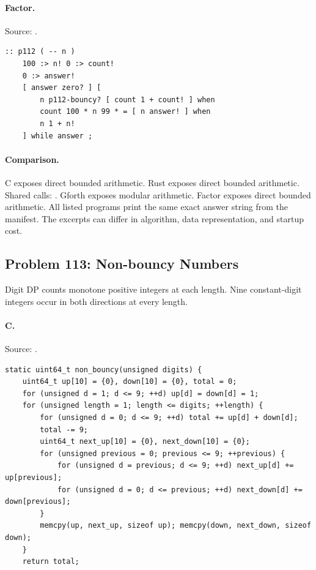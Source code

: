 \paragraph{Factor.} Source: .
\begin{lstlisting}
:: p112 ( -- n )
    100 :> n! 0 :> count!
    0 :> answer!
    [ answer zero? ] [
        n p112-bouncy? [ count 1 + count! ] when
        count 100 * n 99 * = [ n answer! ] when
        n 1 + n!
    ] while answer ;
\end{lstlisting}

\paragraph{Comparison.}
C exposes direct bounded arithmetic. Rust exposes direct bounded arithmetic. Shared calls: \texttt{}. Gforth exposes modular arithmetic. Factor exposes direct bounded arithmetic.
All listed programs print the same exact answer string from the manifest. The excerpts can differ in algorithm, data representation, and startup cost.

\subsection{Problem 113: Non-bouncy Numbers}
\label{walkthrough:p113}
Digit DP counts monotone positive integers at each length. Nine constant-digit integers occur in both directions at every length.

\paragraph{C.} Source: .
\begin{lstlisting}
static uint64_t non_bouncy(unsigned digits) {
    uint64_t up[10] = {0}, down[10] = {0}, total = 0;
    for (unsigned d = 1; d <= 9; ++d) up[d] = down[d] = 1;
    for (unsigned length = 1; length <= digits; ++length) {
        for (unsigned d = 0; d <= 9; ++d) total += up[d] + down[d];
        total -= 9;
        uint64_t next_up[10] = {0}, next_down[10] = {0};
        for (unsigned previous = 0; previous <= 9; ++previous) {
            for (unsigned d = previous; d <= 9; ++d) next_up[d] += up[previous];
            for (unsigned d = 0; d <= previous; ++d) next_down[d] += down[previous];
        }
        memcpy(up, next_up, sizeof up); memcpy(down, next_down, sizeof down);
    }
    return total;
\end{lstlisting}

